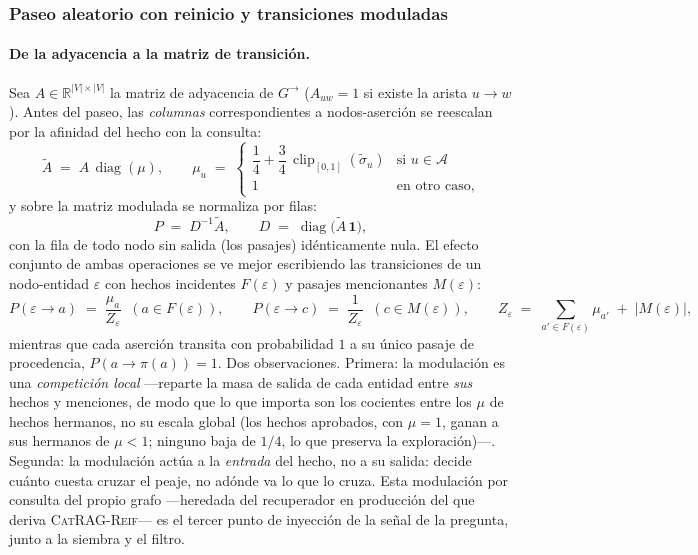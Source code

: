 \documentclass[11pt,a4paper]{article}
\newcommand{\sys}{\textsc{CatRAG-Reif}}          %
\newcommand{\op}[1]{\operatorname{#1}}
\newcommand{\R}{\mathbb{R}}
\begin{document}
\subsubsection{Paseo aleatorio con reinicio y transiciones moduladas}
\label{sec:ppr}

\paragraph{De la adyacencia a la matriz de transición.}
Sea $A\in\R^{|V|\times|V|}$ la matriz de adyacencia de
$G^{\!\rightarrow}$ ($A_{uw}=1$ si existe la arista $u\to w$). Antes del
paseo, las \emph{columnas} correspondientes a nodos-aserción se reescalan
por la afinidad del hecho con la consulta:
\begin{equation}
\tilde{A} \;=\; A\,\op{diag}(\mu),
\qquad
\mu_u \;=\;
\begin{cases}
\dfrac14 + \dfrac34\,\op{clip}_{[0,1]}(\tilde{\sigma}_u)
   & \text{si } u \in \mathcal{A}\\[6pt]
1  & \text{en otro caso,}
\end{cases}
\label{eq:modulacion}
\end{equation}
y sobre la matriz modulada se normaliza por filas:
\begin{equation}
P \;=\; D^{-1}\tilde{A},
\qquad
D \;=\; \op{diag}\bigl(\tilde{A}\,\mathbf{1}\bigr),
\label{eq:transicion}
\end{equation}
con la fila de todo nodo sin salida (los pasajes) idénticamente nula. El
efecto conjunto de ambas operaciones se ve mejor escribiendo las
transiciones de un nodo-entidad $\varepsilon$ con hechos incidentes
$F(\varepsilon)$ y pasajes mencionantes $M(\varepsilon)$:
\begin{equation}
P(\varepsilon\to a) \;=\; \frac{\mu_a}{Z_\varepsilon}
\;\;(a\in F(\varepsilon)),
\qquad
P(\varepsilon\to c) \;=\; \frac{1}{Z_\varepsilon}
\;\;(c\in M(\varepsilon)),
\qquad
Z_\varepsilon \;=\; \sum_{a'\in F(\varepsilon)}\!\mu_{a'} \;+\;
|M(\varepsilon)|,
\label{eq:transiciones}
\end{equation}
mientras que cada aserción transita con probabilidad $1$ a su único pasaje
de procedencia, $P(a\to\pi(a))=1$. Dos observaciones. Primera: la
modulación es una \emph{competición local} ---reparte la masa de salida de
cada entidad entre \emph{sus} hechos y menciones, de modo que lo que
importa son los cocientes entre los $\mu$ de hechos hermanos, no su escala
global (los hechos aprobados, con $\mu=1$, ganan a sus hermanos de
$\mu<1$; ninguno baja de $1/4$, lo que preserva la exploración)---.
Segunda: la modulación actúa a la \emph{entrada} del hecho, no a su
salida: decide cuánto cuesta cruzar el peaje, no adónde va lo que lo
cruza. Esta modulación por consulta del propio grafo ---heredada del
recuperador en producción del que deriva \sys{}--- es el tercer punto de
inyección de la señal de la pregunta, junto a la siembra y el filtro.
\end{document}
